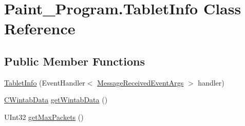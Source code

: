 \hypertarget{class_paint___program_1_1_tablet_info}{}\section{Paint\+\_\+\+Program.\+Tablet\+Info Class Reference}
\label{class_paint___program_1_1_tablet_info}
\subsection*{Public Member Functions}
\begin{DoxyCompactItemize}
\item 
\mbox{\hyperlink{class_paint___program_1_1_tablet_info_afc7015701d66e276d81ffb40fb22e381}{Tablet\+Info}} (Event\+Handler$<$ \mbox{\hyperlink{class_wintab_d_n_1_1_message_received_event_args}{Message\+Received\+Event\+Args}} $>$ handler)
\item 
\mbox{\hyperlink{class_wintab_d_n_1_1_c_wintab_data}{C\+Wintab\+Data}} \mbox{\hyperlink{class_paint___program_1_1_tablet_info_ab9818599347fcfbc04c65e173ffe53a3}{get\+Wintab\+Data}} ()
\item 
U\+Int32 \mbox{\hyperlink{class_paint___program_1_1_tablet_info_a934c6f9d86beb999e083eb871dc59cc6}{get\+Max\+Packets}} ()
\end{DoxyCompactItemize}
